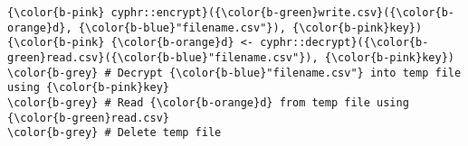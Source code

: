 \documentclass[class=minimal,border=0]{standalone}
\begin{document}
%
\begin{BVerbatim}[bgcolor=b-darkgrey]
{\color{b-pink} cyphr::encrypt}({\color{b-green}write.csv}({\color{b-orange}d}, {\color{b-blue}"filename.csv"}), {\color{b-pink}key})
{\color{b-pink} {\color{b-orange}d} <- cyphr::decrypt}({\color{b-green}read.csv}({\color{b-blue}"filename.csv"}), {\color{b-pink}key})
\color{b-grey} # Decrypt {\color{b-blue}"filename.csv"} into temp file using {\color{b-pink}key}
\color{b-grey} # Read {\color{b-orange}d} from temp file using {\color{b-green}read.csv}
\color{b-grey} # Delete temp file
\end{BVerbatim}
\end{document}
